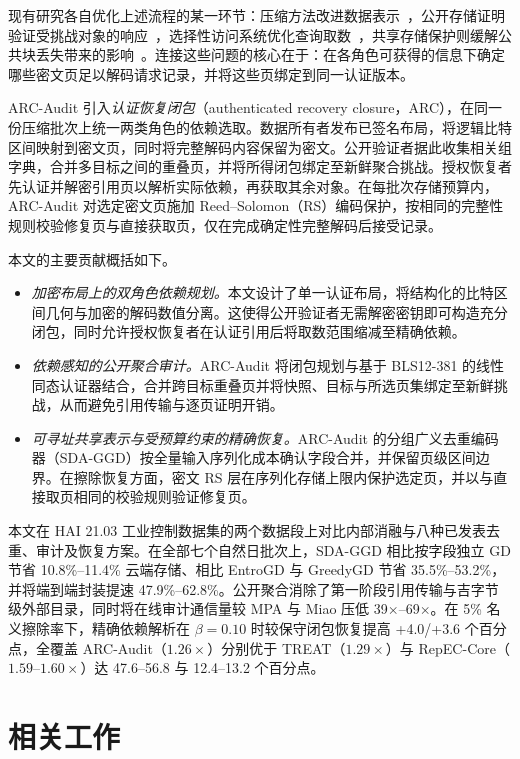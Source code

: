 \documentclass[10pt,journal]{IEEEtran}
\begin{document}
现有研究各自优化上述流程的某一环节：压缩方法改进数据表示~\cite{Hurst2024GreedyGD}，公开存储证明验证受挑战对象的响应~\cite{ShachamWaters2013}，选择性访问系统优化查询取数~\cite{Taurone2024TREAT}，共享存储保护则缓解公共块丢失带来的影响~\cite{Bhagwat2006Reliability}。连接这些问题的核心在于：在各角色可获得的信息下确定哪些密文页足以解码请求记录，并将这些页绑定到同一认证版本。

ARC-Audit 引入\emph{认证恢复闭包}（authenticated recovery closure，ARC），在同一份压缩批次上统一两类角色的依赖选取。数据所有者发布已签名布局，将逻辑比特区间映射到密文页，同时将完整解码内容保留为密文。公开验证者据此收集相关组字典，合并多目标之间的重叠页，并将所得闭包绑定至新鲜聚合挑战。授权恢复者先认证并解密引用页以解析实际依赖，再获取其余对象。在每批次存储预算内，ARC-Audit 对选定密文页施加 Reed--Solomon（RS）编码保护，按相同的完整性规则校验修复页与直接获取页，仅在完成确定性完整解码后接受记录。

本文的主要贡献概括如下。
\begin{itemize}
\item \emph{加密布局上的双角色依赖规划。}本文设计了单一认证布局，将结构化的比特区间几何与加密的解码数值分离。这使得公开验证者无需解密密钥即可构造充分闭包，同时允许授权恢复者在认证引用后将取数范围缩减至精确依赖。
\item \emph{依赖感知的公开聚合审计。}ARC-Audit 将闭包规划与基于 BLS12-381 的线性同态认证器结合，合并跨目标重叠页并将快照、目标与所选页集绑定至新鲜挑战，从而避免引用传输与逐页证明开销。
\item \emph{可寻址共享表示与受预算约束的精确恢复。}ARC-Audit 的分组广义去重编码器（SDA-GGD）按全量输入序列化成本确认字段合并，并保留页级区间边界。在擦除恢复方面，密文 RS 层在序列化存储上限内保护选定页，并以与直接取页相同的校验规则验证修复页。
\end{itemize}

本文在 HAI 21.03 工业控制数据集的两个数据段上对比内部消融与八种已发表去重、审计及恢复方案。在全部七个自然日批次上，SDA-GGD 相比按字段独立 GD 节省 10.8\%--11.4\% 云端存储、相比 EntroGD 与 GreedyGD 节省 35.5\%--53.2\%，并将端到端封装提速 47.9\%--62.8\%。公开聚合消除了第一阶段引用传输与吉字节级外部目录，同时将在线审计通信量较 MPA 与 Miao 压低 39$\times$--69$\times$。在 5\% 名义擦除率下，精确依赖解析在 $\beta{=}0.10$ 时较保守闭包恢复提高 +4.0/+3.6 个百分点，全覆盖 ARC-Audit（$1.26\times$）分别优于 TREAT（$1.29\times$）与 RepEC-Core（$1.59$--$1.60\times$）达 47.6--56.8 与 12.4--13.2 个百分点。
\section{相关工作}
\end{document}
